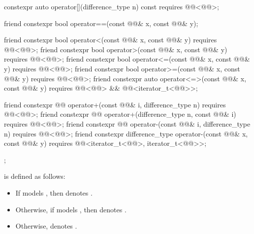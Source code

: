 \begin{codeblock}
{{    constexpr auto operator[](difference_type n) const
      requires @@<@@>;

    friend constexpr bool operator==(const @@& x, const @@& y);

    friend constexpr bool operator<(const @@& x, const @@& y)
      requires @@<@@>;
    friend constexpr bool operator>(const @@& x, const @@& y)
      requires @@<@@>;
    friend constexpr bool operator<=(const @@& x, const @@& y)
      requires @@<@@>;
    friend constexpr bool operator>=(const @@& x, const @@& y)
      requires @@<@@>;
    friend constexpr auto operator<=>(const @@& x, const @@& y)
      requires @@<@@> &&
               @@<iterator_t<@@>>;

    friend constexpr @@ operator+(const @@& i, difference_type n)
      requires @@<@@>;
    friend constexpr @@ operator+(difference_type n, const @@& i)
      requires @@<@@>;
    friend constexpr @@ operator-(const @@& i, difference_type n)
      requires @@<@@>;
    friend constexpr difference_type operator-(const @@& x, const @@& y)
      requires @@<iterator_t<@@>, iterator_t<@@>>;
  };
}
\end{codeblock}

\pnum
{} is defined as follows:
\begin{itemize}
\item
If  models ,
then  denotes .
\item
Otherwise, if  models ,
then  denotes .
\item
Otherwise,  denotes .
\end{itemize}


